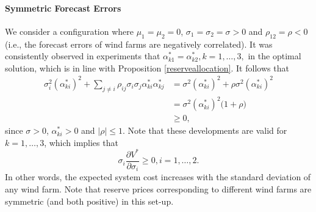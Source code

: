 \documentclass{article}
\begin{document}
\paragraph{Symmetric Forecast Errors} We consider a configuration where $\mu_1 = \mu_2 = 0$, $\sigma_1 = \sigma_2 = \sigma > 0$ and $\rho_{12} = \rho < 0$ (i.e., the forecast errors of wind farms are negatively correlated). It was consistently observed in experiments that $\alpha_{k1}^* = \alpha_{k2}^*, k = 1, \ldots, 3,$ in the optimal solution, which is in line with Proposition \ref{reserveallocation}. It follows that
\begin{align*}
\sigma_i^2 (\alpha_{ki}^*)^2 + \sum_{j \ne i} \rho_{ij} \sigma_i \sigma_j \alpha_{ki}^* \alpha_{kj}^* &= \sigma^2 (\alpha_{ki}^*)^2 + \rho \sigma^2 (\alpha_{ki}^*)^2\\
&= \sigma^2 (\alpha_{ki}^*)^2 \big(1 + \rho\big)\\
&\ge 0,
\end{align*}
since $\sigma > 0$, $\alpha_{ki}^* > 0$ and $|\rho| \le 1$. Note that these developments are valid for $k = 1, \ldots, 3$, which implies that 
\begin{equation*}
\sigma_i \frac{\partial V^*}{\partial \sigma_i} \ge 0, i = 1, \ldots, 2.
\end{equation*}
In other words, the expected system cost increases with the standard deviation of any wind farm. Note that reserve prices corresponding to different wind farms are symmetric (and both positive) in this set-up.
\end{document}
